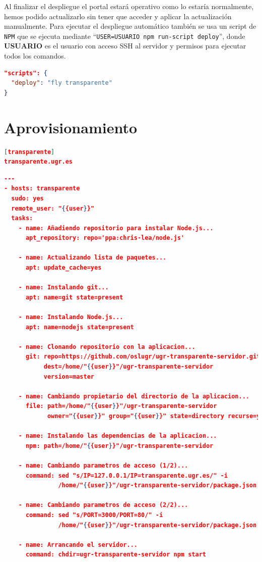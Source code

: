 Al finalizar el despliegue el portal estará operativo como lo estaría normalmente, hemos podido actualizarlo sin tener que acceder y aplicar la actualización manualmente. Para ejecutar el despliegue automático también se usa un script de {\tt NPM} que se ejecuta mediante ``{\tt USER=USUARIO npm run-script deploy}'', donde \textbf{USUARIO} es el usuario con acceso SSH al servidor y permisos para ejecutar todos los comandos.

\begin{lstlisting}[language=json,caption={Scripts de despliegue automático},label={lst:deploy}]
"scripts": {
  "deploy": "fly transparente"
}
\end{lstlisting}

\section{Aprovisionamiento}

\begin{lstlisting}[language=json,caption={Archivo de hosts},label={lst:hosts}]
[transparente]
transparente.ugr.es
\end{lstlisting}

\begin{lstlisting}[language=json,caption={Playbook de Ansible},label={lst:ansible}]
---
- hosts: transparente
  sudo: yes
  remote_user: "{{user}}"
  tasks:
    - name: Añadiendo repositorio para instalar Node.js...
      apt_repository: repo='ppa:chris-lea/node.js'

    - name: Actualizando lista de paquetes...
      apt: update_cache=yes

    - name: Instalando git...
      apt: name=git state=present

    - name: Instalando Node.js...
      apt: name=nodejs state=present

    - name: Clonando repositorio con la aplicacion...
      git: repo=https://github.com/oslugr/ugr-transparente-servidor.git
           dest=/home/"{{user}}"/ugr-transparente-servidor
           version=master

    - name: Cambiando propietario del directorio de la aplicacion...
      file: path=/home/"{{user}}"/ugr-transparente-servidor
            owner="{{user}}" group="{{user}}" state=directory recurse=yes

    - name: Instalando las dependencias de la aplicacion...
      npm: path=/home/"{{user}}"/ugr-transparente-servidor

    - name: Cambiando parametros de acceso (1/2)...
      command: sed "s/IP=127.0.0.1/IP=transparente.ugr.es/" -i
               /home/"{{user}}"/ugr-transparente-servidor/package.json

    - name: Cambiando parametros de acceso (2/2)...
      command: sed "s/PORT=3000/PORT=80/" -i
               /home/"{{user}}"/ugr-transparente-servidor/package.json

    - name: Arrancando el servidor...
      command: chdir=ugr-transparente-servidor npm start
\end{lstlisting}